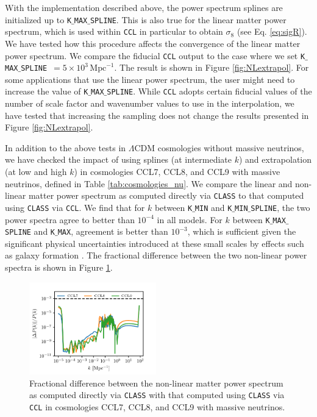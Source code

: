 \documentclass[\docopts]{\docclass}
\newcommand{\ccl}{{\tt CCL}\xspace}
\newcommand{\class}{{\tt CLASS}\xspace}
\begin{document}
With the implementation described above, the power spectrum splines are initialized up to {\tt K$\_$MAX$\_$SPLINE}. This is also true for the linear matter power spectrum, which is used within \ccl in particular to obtain $\sigma_8$ (see Eq. \ref{eq:sigR}). We have tested how this procedure affects the convergence of the linear matter power spectrum. We compare the fiducial \ccl output to the case where we set {\tt K$\_$MAX$\_$SPLINE}~$=5\times 10^3\,\text{Mpc}^{-1}$. The result is shown in Figure \ref{fig:NLextrapol}. For some applications that use the linear power spectrum, the user might need to increase the value of {\tt K$\_$MAX$\_$SPLINE}. While \ccl adopts certain fiducial values of the number of scale factor and wavenumber values to use in the interpolation, we have tested that increasing the sampling does not change the results presented in Figure \ref{fig:NLextrapol}. 

In addition to the above tests in $\Lambda$CDM cosmologies without massive neutrinos, we have checked the impact of using splines (at intermediate $k$) and extrapolation (at low and high $k$) in cosmologies CCL7, CCL8, and CCL9 with massive neutrinos, defined in Table \ref{tab:cosmologies_nu}. We compare the linear and non-linear matter power spectrum as computed directly via \class to that computed using \class via \ccl . We find that for $k$  between {\tt K$\_$MIN} and {\tt K$\_$MIN$\_$SPLINE}, the two power spectra agree to better than $10^{-4}$ in all models. For $k$ between {\tt K$\_$MAX$\_$SPLINE} and {\tt K$\_$MAX}, agreement is better than $10^{-3}$, which is sufficient given the significant physical uncertainties introduced at these small scales by effects such as galaxy formation \citep{vanDaalen11}. The fractional difference between the two non-linear power spectra is shown in Figure \ref{fig:power_nu}. 

\begin{figure}
\centering
\includegraphics[width=0.49\textwidth]{pk_class_nu_NL}
\caption{Fractional difference between the non-linear matter power spectrum as computed directly via \class with that computed using \class via \ccl in cosmologies CCL7, CCL8, and CCL9 with massive neutrinos.}
\label{fig:power_nu}
\end{figure}
\end{document}
